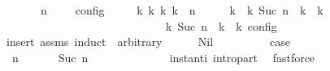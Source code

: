 \begin{isabellebody}
\ \ \ {\isacartoucheopen}{\isasymrho}\ {\isasymin}\ {\isasymlbrakk}\ {\isasymGamma}{\isacharcomma}\ n\ {\isasymturnstile}\ {\isasymPsi}\ {\isasymtriangleright}\ {\isasymPhi}\ {\isasymrbrakk}\isactrlsub c\isactrlsub o\isactrlsub n\isactrlsub f\isactrlsub i\isactrlsub g{\isacartoucheclose}\isanewline
\ \ \ \ \ {\isacartoucheopen}{\isasymexists}{\isasymGamma}\isactrlsub k\ {\isasymPsi}\isactrlsub k\ {\isasymPhi}\isactrlsub k\ k{\isachardot}\ {\isacharparenleft}{\isacharparenleft}{\isasymGamma}{\isacharcomma}\ n\ {\isasymturnstile}\ {\isasymPsi}\ {\isasymtriangleright}\ {\isasymPhi}{\isacharparenright}\ \ {\isasymhookrightarrow}\isactrlbsup k\isactrlesup \ \ {\isacharparenleft}{\isasymGamma}\isactrlsub k{\isacharcomma}\ Suc\ n\ {\isasymturnstile}\ {\isasymPsi}\isactrlsub k\ {\isasymtriangleright}\ {\isasymPhi}\isactrlsub k{\isacharparenright}{\isacharparenright}\isanewline
\ \ \ \ \ \ \ \ \ \ \ \ \ \ \ \ \ \ \ \ \ \ \ \ \ {\isasymand}\ {\isasymrho}\ {\isasymin}\ {\isasymlbrakk}\ {\isasymGamma}\isactrlsub k{\isacharcomma}\ Suc\ n\ {\isasymturnstile}\ {\isasymPsi}\isactrlsub k\ {\isasymtriangleright}\ {\isasymPhi}\isactrlsub k\ {\isasymrbrakk}\isactrlsub c\isactrlsub o\isactrlsub n\isactrlsub f\isactrlsub i\isactrlsub g{\isacartoucheclose}\isanewline
%
\isadelimproof
%
\endisadelimproof
%
\isatagproof
{}\isamarkupfalse%
\ {\isacharparenleft}insert\ assms{\isacharcomma}\ induct\ {\isasymPsi}\ arbitrary{\isacharcolon}\ {\isasymGamma}\ {\isasymPhi}{\isacharparenright}\isanewline
\ \ \isamarkupfalse%
\ {\isacharparenleft}Nil\ {\isasymGamma}\ {\isasymPhi}{\isacharparenright}\isanewline
\ \ \ \ \isamarkupfalse%
\ \isamarkupfalse%
\ {\isacharquery}case\isanewline
\ \ \ \ \isamarkupfalse%
\ {\isacharminus}\isanewline
\ \ \ \ \ \ \isamarkupfalse%
\ {\isacartoucheopen}{\isacharparenleft}{\isasymGamma}{\isacharcomma}\ n\ {\isasymturnstile}\ {\isacharbrackleft}{\isacharbrackright}\ {\isasymtriangleright}\ {\isasymPhi}{\isacharparenright}\ {\isasymhookrightarrow}\isactrlesup \ {\isacharparenleft}{\isasymGamma}{\isacharcomma}\ Suc\ n\ {\isasymturnstile}\ {\isasymPhi}\ {\isasymtriangleright}\ {\isacharbrackleft}{\isacharbrackright}{\isacharparenright}{\isacartoucheclose}\isanewline
\ \ \ \ \ \ \ \ \isamarkupfalse%
\ instant{\isacharunderscore}i\ intro{\isacharunderscore}part\ \isamarkupfalse%
\ fastforce\isanewline
\ \ \ \ \ \ \isamarkupfalse%
\ \isamarkupfalse%

\end{isabellebody}
